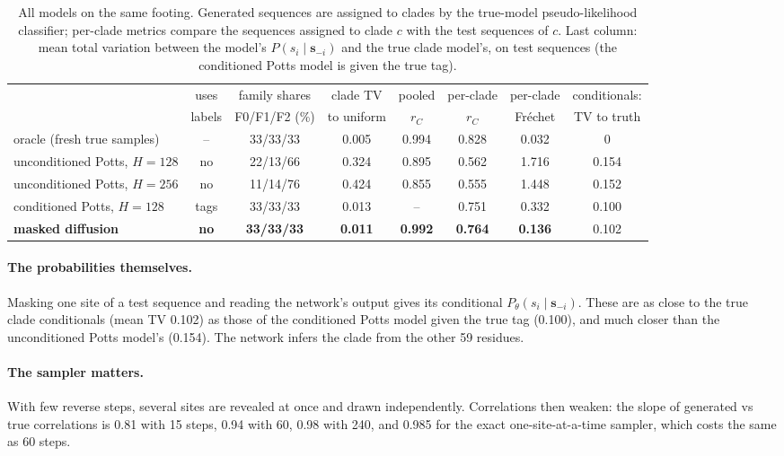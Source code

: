 \documentclass[10pt,a4paper,twocolumn]{article}
\begin{document}
\begin{table}[t]
\centering\small
\begin{tabular}{lccccccc}
\toprule
 & uses & family shares & clade TV & pooled & per-clade & per-clade & conditionals:\\
 & labels & F0/F1/F2 (\%) & to uniform & $r_C$ & $r_C$ & Fréchet & TV to truth\\
\midrule
oracle (fresh true samples) & -- & 33/33/33 & 0.005 & 0.994 & 0.828 & 0.032 & 0\\
unconditioned Potts, $H=128$ & no & 22/13/66 & 0.324 & 0.895 & 0.562 & 1.716 & 0.154\\
unconditioned Potts, $H=256$ & no & 11/14/76 & 0.424 & 0.855 & 0.555 & 1.448 & 0.152\\
conditioned Potts, $H=128$ & tags & 33/33/33 & 0.013 & -- & 0.751 & 0.332 & 0.100\\
\textbf{masked diffusion} & \textbf{no} & \textbf{33/33/33} & \textbf{0.011} & \textbf{0.992} & \textbf{0.764} & \textbf{0.136} & 0.102\\
\bottomrule
\end{tabular}
\caption{All models on the same footing. Generated sequences are assigned to clades by the true-model
pseudo-likelihood classifier; per-clade metrics compare the sequences assigned to clade $c$ with the test sequences
of $c$. Last column: mean total variation between the model's $P(s_i\mid\bm s_{-i})$ and the true clade model's, on test
sequences (the conditioned Potts model is given the true tag).}
\label{tab:all}
\end{table}

\paragraph{The probabilities themselves.} Masking one site of a test sequence and reading the network's output gives
its conditional $P_\theta(s_i\mid\bm s_{-i})$. These are as close to the true clade conditionals (mean TV 0.102) as
those of the conditioned Potts model given the true tag (0.100), and much closer than the unconditioned Potts
model's (0.154). The network infers the clade from the other 59 residues.

\paragraph{The sampler matters.} With few reverse steps, several sites are revealed at once and drawn independently.
Correlations then weaken: the slope of generated vs true correlations is 0.81 with 15 steps, 0.94 with 60, 0.98
with 240, and 0.985 for the exact one-site-at-a-time sampler, which costs the same as 60 steps.
\end{document}
